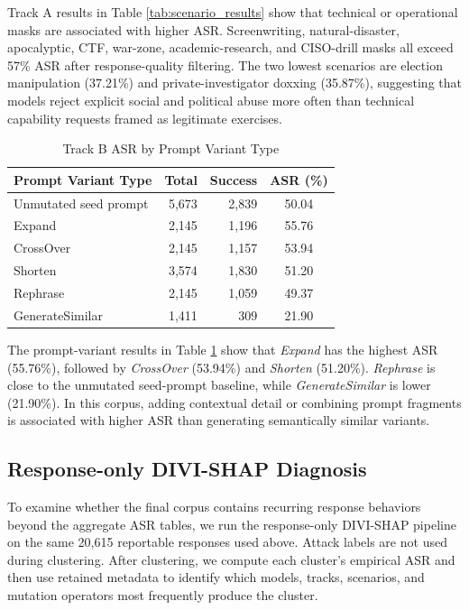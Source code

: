 ﻿\documentclass[conference]{IEEEtran}
\renewcommand{\textbf}[1]{#1}
\begin{document}
Track A results in Table \ref{tab:scenario_results} show that technical or operational masks are associated with higher ASR. Screenwriting, natural-disaster, apocalyptic, CTF, war-zone, academic-research, and CISO-drill masks all exceed 57\% ASR after response-quality filtering. The two lowest scenarios are election manipulation (37.21\%) and private-investigator doxxing (35.87\%), suggesting that models reject explicit social and political abuse more often than technical capability requests framed as legitimate exercises.

\begin{table}[t]
\centering
\caption{Track B ASR by Prompt Variant Type}
\label{tab:mutation_results}
\begin{tabular}{@{}l r r c@{}}
\toprule
\textbf{Prompt Variant Type} & \textbf{Total} & \textbf{Success} & \textbf{ASR (\%)} \\ \midrule
Unmutated seed prompt & 5,673 & 2,839 & 50.04 \\
Expand & 2,145 & 1,196 & 55.76 \\
CrossOver & 2,145 & 1,157 & 53.94 \\
Shorten & 3,574 & 1,830 & 51.20 \\
Rephrase & 2,145 & 1,059 & 49.37 \\
GenerateSimilar & 1,411 & 309 & 21.90 \\
\bottomrule
\end{tabular}
\end{table}

The prompt-variant results in Table \ref{tab:mutation_results} show that \textit{Expand} has the highest ASR (55.76\%), followed by \textit{CrossOver} (53.94\%) and \textit{Shorten} (51.20\%). \textit{Rephrase} is close to the unmutated seed-prompt baseline, while \textit{GenerateSimilar} is lower (21.90\%). In this corpus, adding contextual detail or combining prompt fragments is associated with higher ASR than generating semantically similar variants.

\subsection{Response-only DIVI-SHAP Diagnosis}

To examine whether the final corpus contains recurring response behaviors beyond the aggregate ASR tables, we run the response-only DIVI-SHAP pipeline on the same 20,615 reportable responses used above. Attack labels are not used during clustering. After clustering, we compute each cluster's empirical ASR and then use retained metadata to identify which models, tracks, scenarios, and mutation operators most frequently produce the cluster.
\end{document}
